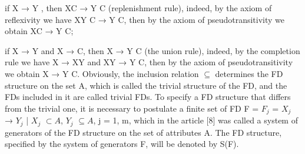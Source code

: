 \documentclass[10pt]{article}
\begin{document}
\begin{multicols}{2}
if X → Y , then XC → Y C (replenishment rule),
indeed, by the axiom of reflexivity we have XY C →
Y C, then by the axiom of pseudotransitivity we obtain
XC → Y C;

if X → Y and X → C, then X → Y C (the union
rule), indeed, by the completion rule we have X → XY
and XY → Y C, then by the axiom of pseudotransitivity
we obtain X → Y C.
\newpage
Obviously, the inclusion relation $\subseteq$ determines the FD
structure on the set A, which is called the trivial structure
of the FD, and the FDs included in it are called trivial
FDs. To specify a FD structure that differs from the trivial
one, it is necessary to postulate a finite set of FD F =
{$F_j$ = $X_j$ → $Y_j$ | $X_j$ $\subset A$, $Y_j$ $\subseteq A$, j = 1, m}, which in
the article [8] was called a system of generators of the
FD structure on the set of attributes A. The FD structure,
specified by the system of generators F, will be denoted
by S(F).


\end{multicols}
\end{document}
